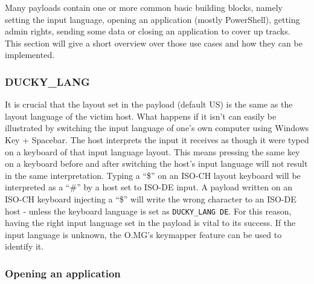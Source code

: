Many payloads contain one or more common basic building blocks, namely setting the input language, opening an application (mostly PowerShell), getting admin rights, sending some data or closing an application to cover up tracks.  \\
This section will give a short overview over those use cases and how they can be implemented.

\subsubsection{DUCKY\_LANG} \label{ducky\_lang}

It is crucial that the layout set in the payload (default US) is the same as the layout language of the victim host. What happens if it isn't can easily be illustrated by switching the input language of one's own computer using Windows Key + Spacebar. The host interprets the input it receives as though it were typed on a keyboard of that input language layout. This means pressing the same key on a keyboard before and after switching the host's input language will not result in the same interpretation. Typing a ``\$'' on an ISO-CH layout keyboard will be interpreted as a ``#'' by a host set to ISO-DE input. A payload written on an ISO-CH keyboard injecting a ``\$''  will write the wrong character to an ISO-DE host - unless the keyboard language is set as \verb|DUCKY_LANG DE|. 
For this reason, having the right input language set in the payload is vital to its success. If the input language is unknown, the O.MG's keymapper feature can be used to identify it.



\subsubsection{Opening an application}

